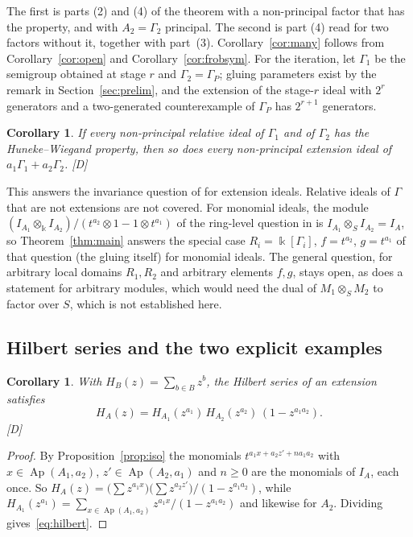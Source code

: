 \documentclass[11pt]{article}
\newtheorem{corollary}[theorem]{Corollary}
\theoremstyle{definition}
\theoremstyle{remark}
\newcommand{\kk}{\Bbbk}
\newcommand{\Ap}{\operatorname{Ap}}
\newcommand{\mD}{\emph{[D]}}
\begin{document}
The first is parts (2) and (4) of the theorem with a non-principal factor that has the property, and with $A_2=\Gamma_2$
principal. The second is part (4) read for two factors without it, together with part~(3). Corollary~\ref{cor:many} follows
from Corollary~\ref{cor:open} and Corollary~\ref{cor:frobsym}. For the iteration, let $\Gamma_1$ be the semigroup obtained at
stage $r$ and $\Gamma_2=\Gamma_P$; gluing parameters exist by the remark in Section~\ref{sec:prelim}, and the extension of the
stage-$r$ ideal with $2^r$ generators and a two-generated counterexample of $\Gamma_P$ has $2^{r+1}$ generators.

\begin{corollary}\label{cor:invariance}
If every non-principal relative ideal of $\Gamma_1$ and of $\Gamma_2$ has the Huneke--Wiegand property,
then so does every non-principal extension ideal of $a_1\Gamma_1+a_2\Gamma_2$. \mD{}
\end{corollary}

This answers the invariance question of \cite[Section~4]{GarciaSanchezLeamer2013} for extension ideals. Relative ideals of
$\Gamma$ that are not extensions are not covered. For monomial ideals, the module
$(I_{A_1}\otimes_\kk I_{A_2})/(t^{a_2}\otimes1-1\otimes t^{a_1})$ of the ring-level question in
\cite[Section~4]{GarciaSanchezLeamer2013} is $I_{A_1}\otimes_SI_{A_2}=I_A$, so Theorem~\ref{thm:main} answers the special case $R_i=\kk[\Gamma_i]$, $f=t^{a_2}$, $g=t^{a_1}$ of that question (the gluing itself)
for monomial ideals. The general question, for arbitrary local domains $R_1,R_2$ and arbitrary elements $f,g$, stays open, as does a statement for arbitrary modules, which would need the dual of $M_1\otimes_SM_2$ to factor over $S$, which is
not established here.

\subsection{Hilbert series and the two explicit examples}

\begin{corollary}\label{cor:hilbert}
With $H_B(z)=\sum_{b\in B}z^b$, the Hilbert series of an extension satisfies
\begin{equation}\label{eq:hilbert}
H_A(z)=H_{A_1}(z^{a_1})\,H_{A_2}(z^{a_2})\,(1-z^{a_1a_2}).
\end{equation}
\mD{}
\end{corollary}

\begin{proof}
By Proposition~\ref{prop:iso} the monomials $t^{a_1x+a_2z'+na_1a_2}$ with $x\in\Ap(A_1,a_2)$, $z'\in\Ap(A_2,a_1)$ and $n\ge0$ are
the monomials of $I_A$, each once. So $H_A(z)=\bigl(\sum z^{a_1x}\bigr)\bigl(\sum z^{a_2z'}\bigr)/(1-z^{a_1a_2})$, while
$H_{A_1}(z^{a_1})=\sum_{x\in\Ap(A_1,a_2)}z^{a_1x}/(1-z^{a_1a_2})$ and likewise for $A_2$. Dividing gives~\eqref{eq:hilbert}.
\end{proof}
\end{document}

